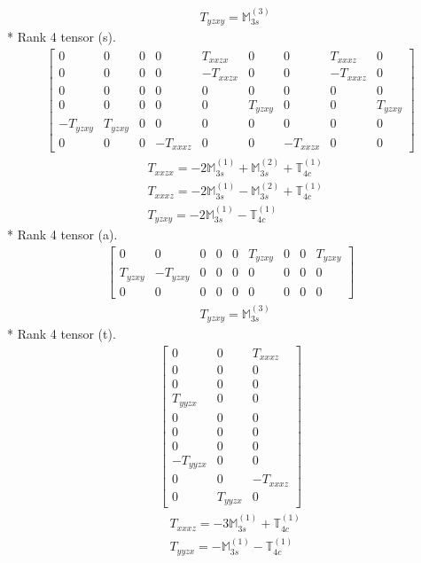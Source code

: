 \documentclass[fleqn,8pt,landscape]{jsarticle}
\begin{document}
\begin{align*}
& T_{yzxy} = \mathbb{M}_{3s}^{(3)}
\end{align*}
* Rank 4 tensor (s).
\begin{align*}
\begin{bmatrix} 0 & 0 & 0 & 0 & T_{xxzx} & 0 & 0 & T_{xxxz} & 0 \\ 0 & 0 & 0 & 0 & - T_{xxzx} & 0 & 0 & - T_{xxxz} & 0 \\ 0 & 0 & 0 & 0 & 0 & 0 & 0 & 0 & 0 \\ 0 & 0 & 0 & 0 & 0 & T_{yzxy} & 0 & 0 & T_{yzxy} \\ - T_{yzxy} & T_{yzxy} & 0 & 0 & 0 & 0 & 0 & 0 & 0 \\ 0 & 0 & 0 & - T_{xxxz} & 0 & 0 & - T_{xxzx} & 0 & 0 \end{bmatrix}
\end{align*}
\begin{align*}
& T_{xxzx} = - 2 \mathbb{M}_{3s}^{(1)} + \mathbb{M}_{3s}^{(2)} + \mathbb{T}_{4c}^{(1)} \\
& T_{xxxz} = - 2 \mathbb{M}_{3s}^{(1)} - \mathbb{M}_{3s}^{(2)} + \mathbb{T}_{4c}^{(1)} \\
& T_{yzxy} = - 2 \mathbb{M}_{3s}^{(1)} - \mathbb{T}_{4c}^{(1)}
\end{align*}
* Rank 4 tensor (a).
\begin{align*}
\begin{bmatrix} 0 & 0 & 0 & 0 & 0 & T_{yzxy} & 0 & 0 & T_{yzxy} \\ T_{yzxy} & - T_{yzxy} & 0 & 0 & 0 & 0 & 0 & 0 & 0 \\ 0 & 0 & 0 & 0 & 0 & 0 & 0 & 0 & 0 \end{bmatrix}
\end{align*}
\begin{align*}
& T_{yzxy} = \mathbb{M}_{3s}^{(3)}
\end{align*}
* Rank 4 tensor (t).
\begin{align*}
\begin{bmatrix} 0 & 0 & T_{xxxz} \\ 0 & 0 & 0 \\ 0 & 0 & 0 \\ T_{yyzx} & 0 & 0 \\ 0 & 0 & 0 \\ 0 & 0 & 0 \\ 0 & 0 & 0 \\ - T_{yyzx} & 0 & 0 \\ 0 & 0 & - T_{xxxz} \\ 0 & T_{yyzx} & 0 \end{bmatrix}
\end{align*}
\begin{align*}
& T_{xxxz} = - 3 \mathbb{M}_{3s}^{(1)} + \mathbb{T}_{4c}^{(1)} \\
& T_{yyzx} = - \mathbb{M}_{3s}^{(1)} - \mathbb{T}_{4c}^{(1)}
\end{align*}
\end{document}
